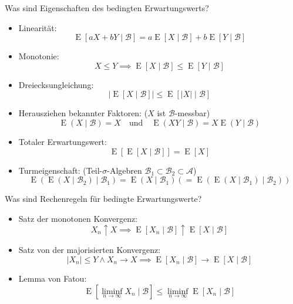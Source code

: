 \begin{QandA}
    \item Was sind Eigenschaften des bedingten Erwartungswerts?
    \begin{answered}
        \begin{itemize}
            \item Linearität:
                  \[ \operatorname{E}[aX + bY \mid \mathcal{B}] = a \operatorname{E}[X \mid \mathcal{B}] + b \operatorname{E}[Y \mid \mathcal{B}] \]
            \item Monotonie:
                  \[ X \leq Y \implies \operatorname{E}[X \mid \mathcal{B}] \leq \operatorname{E}[Y \mid \mathcal{B}] \]
            \item Dreiecksungleichung:
                  \[ |\operatorname{E}[X \mid \mathcal{B}]| \leq \operatorname{E}[|X| \mid \mathcal{B}] \]
            \item Herausziehen bekannter Faktoren: ($X$ ist $\mathcal{B}$-messbar)
                  \[ \operatorname{E} (X \mid{\mathcal{B}}) = X \quad \text{und} \quad \operatorname{E} (XY \mid{\mathcal{B}}) = X \operatorname{E} (Y \mid{\mathcal{B}}) \]
            \item Totaler Erwartungswert:
                  \[ \operatorname{E}[\operatorname{E}[X \mid \mathcal{B}]] = \operatorname{E}[X] \]
            \item Turmeigenschaft: (Teil-$\sigma$-Algebren $\mathcal{B}_{1}\subset{\mathcal{B}}_{2}\subset{\mathcal{A}}$)
                  \[ \operatorname{E} (\operatorname{E} (X\mid{\mathcal{B}}_{2})\mid{\mathcal{B}}_{1})=\operatorname{E} (X\mid{\mathcal{B}}_{1})(=\operatorname{E} (\operatorname{E} (X\mid{\mathcal{B}}_{1})\mid{\mathcal{B}}_{2})) \]
        \end{itemize}
    \end{answered}

    \item Was sind Rechenregeln für bedingte Erwartungswerte?
    \begin{answered}
        \begin{itemize}
            \item Satz der monotonen Konvergenz:
                  \[ X_n \uparrow X \implies \operatorname{E}[X_n \mid \mathcal{B}] \uparrow \operatorname{E}[X \mid \mathcal{B}] \]
            \item Satz von der majorisierten Konvergenz:
                  \[ |X_n| \leq Y \land X_n \to X \implies \operatorname{E}[X_n \mid \mathcal{B}] \to \operatorname{E}[X \mid \mathcal{B}] \]
            \item Lemma von Fatou:
                  \[ \operatorname{E}[\liminf_{n \to \infty} X_n \mid \mathcal{B}] \leq \liminf_{n \to \infty} \operatorname{E}[X_n \mid \mathcal{B}] \]
        \end{itemize}
    \end{answered}


\end{QandA}
